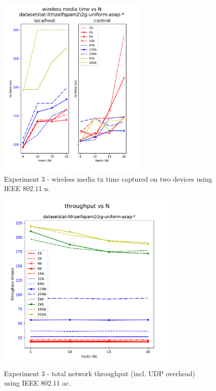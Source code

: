\begin{figure}[tbp]
  \centering
  \includegraphics[width=0.65\textwidth]{images/exp3_wmt.pdf}
  \caption{Experiment 3 - wireless media tx time captured on two devices using IEEE 802.11 n.}
  \label{fig:exp3mediatime}
\end{figure}

\begin{figure}[tbp]
  \centering
  \includegraphics[width=0.8\textwidth]{images/exp4_tput.pdf}
  \caption{Experiment 3 - total network throughput (incl. UDP overhead) using IEEE 802.11 ac.}
  \label{fig:exp4throughput}
\end{figure}


